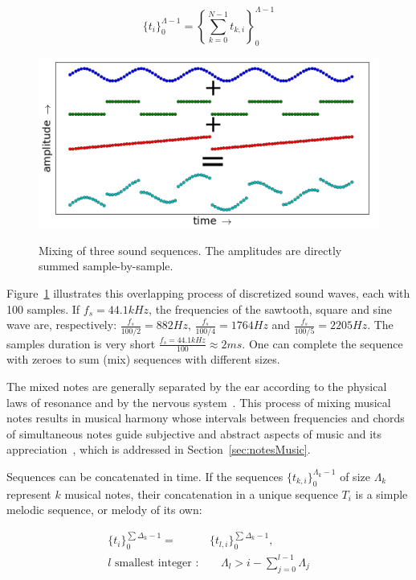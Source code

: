 \begin{equation}\label{eq:mixagem}
\{t_i\}_0^{\Lambda-1}=\left \{ \sum_{k=0}^{N-1}t_{k,i} \right \}_0^{\Lambda-1}
\end{equation}

\begin{figure}[h!]
    {\centering
        \includegraphics[width=.5\columnwidth]{figures/mixagem__}}
    \caption{Mixing of three sound sequences. The amplitudes are directly summed sample-by-sample.}
        \label{fig:mixagem}
\end{figure}

Figure~\ref{fig:mixagem} illustrates this overlapping process of discretized sound waves, each with 100 samples. If $f_s=44.1kHz$, the frequencies of the sawtooth, square and sine wave are, respectively: $\frac{f_s}{100/2}=882Hz$, $\frac{f_s}{100/4}=1764Hz$ and $\frac{f_s}{100/5}=2205Hz$. The samples duration is very short $\frac{f_s=44.1kHz}{100} \approx 2ms$. One can complete the sequence with zeroes to sum (mix) sequences with different sizes.

The mixed notes are generally separated by the ear according to the physical laws of resonance and by the nervous system~\cite{Roederer}.  This process of mixing musical notes results in musical harmony whose intervals between frequencies and chords of simultaneous notes guide subjective and abstract aspects of music and its appreciation~\cite{Harmonia}, which is addressed in Section~\ref{sec:notesMusic}. 

Sequences can be concatenated in time. If the sequences $\{t_{k,i}\}_0^{\Lambda_k-1}$ of size $\Lambda_k$ represent $k$ musical notes, their concatenation in a unique sequence $T_i$ is a simple melodic sequence, or melody of its own:

\begin{equation}\label{eq:concatenacao}
\begin{split}
\{t_i\}_0^{\sum\Delta_k-1}= & \{t_{l,i}\}_0^{\sum\Delta_k-1}, \;\; \\ l\text{ smallest integer } : & \quad \Lambda_l > i -\sum_{j=0}^{l-1}\Lambda_j
\end{split}
\end{equation}

